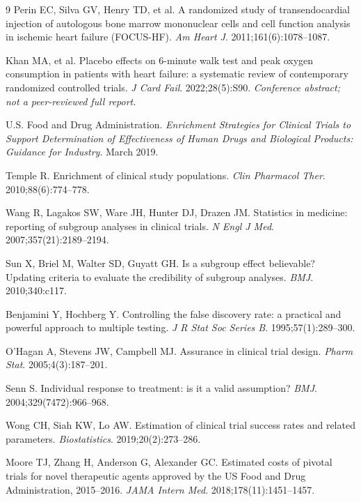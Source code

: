 \documentclass[10pt,twocolumn,letterpaper]{article}
\begin{document}
\begin{thebibliography}{9}
Perin EC, Silva GV, Henry TD, et al. A randomized study of transendocardial injection of autologous
bone marrow mononuclear cells and cell function analysis in ischemic heart failure (FOCUS-HF).
\textit{Am Heart J}. 2011;161(6):1078--1087.

Khan MA, et al. Placebo effects on 6-minute walk test and peak oxygen consumption in patients with
heart failure: a systematic review of contemporary randomized controlled trials. \textit{J Card
Fail}. 2022;28(5):S90. \emph{Conference abstract; not a peer-reviewed full report.}

U.S. Food and Drug Administration. \textit{Enrichment Strategies for Clinical Trials to Support
Determination of Effectiveness of Human Drugs and Biological Products: Guidance for Industry}.
March 2019.

Temple R. Enrichment of clinical study populations. \textit{Clin Pharmacol Ther}.
2010;88(6):774--778.

Wang R, Lagakos SW, Ware JH, Hunter DJ, Drazen JM. Statistics in medicine: reporting of subgroup
analyses in clinical trials. \textit{N Engl J Med}. 2007;357(21):2189--2194.

Sun X, Briel M, Walter SD, Guyatt GH. Is a subgroup effect believable? Updating criteria to evaluate
the credibility of subgroup analyses. \textit{BMJ}. 2010;340:c117.

Benjamini Y, Hochberg Y. Controlling the false discovery rate: a practical and powerful approach to
multiple testing. \textit{J R Stat Soc Series B}. 1995;57(1):289--300.

O'Hagan A, Stevens JW, Campbell MJ. Assurance in clinical trial design. \textit{Pharm Stat}.
2005;4(3):187--201.

Senn S. Individual response to treatment: is it a valid assumption? \textit{BMJ}.
2004;329(7472):966--968.

Wong CH, Siah KW, Lo AW. Estimation of clinical trial success rates and related parameters.
\textit{Biostatistics}. 2019;20(2):273--286.

Moore TJ, Zhang H, Anderson G, Alexander GC. Estimated costs of pivotal trials for novel therapeutic
agents approved by the US Food and Drug Administration, 2015--2016. \textit{JAMA Intern Med}.
2018;178(11):1451--1457.

\end{thebibliography}
\end{document}
